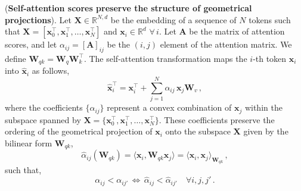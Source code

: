
\begin{proposition}
\label{prop-self-attention-bilinear-form}
%
(\textbf{Self-attention scores preserve the structure of geometrical projections}).
%
Let $\bm{X} \in \mathbb{R}^{N,d}$ be the embedding of a sequence of $N$ tokens such that $\bm{X} = [\bm{x}_0^\top, \bm{x}_1^\top, \dots, \bm{x}_N^\top]$ and $\bm{x}_i \in \mathbb{R}^d \,\,\forall \,i$.  
%
Let $\bm{A}$ be the matrix of attention scores, and let $\alpha_{ij} = [\bm{A}]_{ij}$ be the $(i,j)$ element of the attention matrix.
%
We define $\bm{W}_{qk} = \bm{W}_q\bm{W}_k^\top$.
%
The self-attention transformation maps the $i$-th token $\bm{x}_i$ into $\hat{\bm{x}}_i$ as follows,
%
\begin{equation}
    \hat{\bm{x}}^\top_i = \bm{x}^\top_i + \sum_{j= 1}^N  \alpha_{ij}\,\bm{x}_j\bm{W}_v \,,
\label{eq-prop-self-attention-bilinear-form}
\end{equation}
%
where the coefficients $\{\alpha_{ij}\}$ represent a convex combination of $\bm{x}_j$ within the subspace spanned by $\bm{X} = \{\bm{x}_0^\top, \bm{x}_1^\top, \dots, \bm{x}_N^\top\}$.
%
These coefficients preserve the ordering of the geometrical projection of $\bm{x}_i$ onto the subspace $\bm{X}$ given by the bilinear form $\bm{W}_{qk}$,
%
\begin{equation}
    \hat{\alpha}_{ij}(\bm{W}_{qk}) = \langle \bm{x}_i, \bm{W}_{qk} \bm{x}_j \rangle = \langle \bm{x}_i, \bm{x}_j \rangle_{\bm{W}_{qk}} \,,
\end{equation}
%
such that,
%
\begin{equation}
     \alpha_{ij} < \alpha_{ij'} \,  \Leftrightarrow \,\hat{\alpha}_{ij} < \hat{\alpha}_{ij'}\quad \forall i,j, j' \,.
\end{equation}
%
\end{proposition}
%